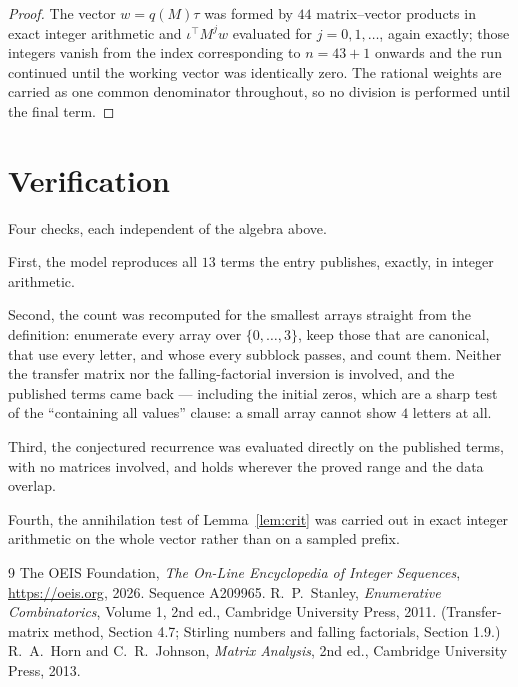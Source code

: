 \documentclass[11pt,a4paper]{article}
\theoremstyle{plain}
\theoremstyle{definition}
\begin{document}
\begin{proof}
The vector $w=q(M)\tau$ was formed by $44$ matrix--vector products in exact integer
arithmetic and $\iota^{\!\top}M^{j}w$ evaluated for $j=0,1,\dots$, again exactly; those
integers vanish from the index corresponding to $n=43+1$ onwards and the run continued
until the working vector was identically zero. The rational weights are carried as one common
denominator throughout, so no division is performed until the final term.
\end{proof}

\section{Verification}

Four checks, each independent of the algebra above.

First, the model reproduces all $13$ terms the entry publishes, exactly, in integer
arithmetic.

Second, the count was recomputed for the smallest arrays straight from the definition:
enumerate every array over $\{0,\dots,3\}$, keep those that are canonical, that use every
letter, and whose every subblock passes, and count them. Neither the transfer matrix nor the
falling-factorial inversion is involved, and the published terms came back --- including the
initial zeros, which are a sharp test of the ``containing all values'' clause: a small array
cannot show $4$ letters at all.

Third, the conjectured recurrence was evaluated directly on the published terms, with no
matrices involved, and holds wherever the proved range and the data overlap.

Fourth, the annihilation test of Lemma~\ref{lem:crit} was carried out in exact integer
arithmetic on the whole vector rather than on a sampled prefix.

\begin{thebibliography}{9}
 The OEIS Foundation, \emph{The On-Line Encyclopedia of Integer
Sequences}, \url{https://oeis.org}, 2026. Sequence A209965.
 R.~P.~Stanley, \emph{Enumerative Combinatorics}, Volume 1, 2nd ed.,
Cambridge University Press, 2011. (Transfer-matrix method, Section 4.7; Stirling numbers and
falling factorials, Section 1.9.)
 R.~A.~Horn and C.~R.~Johnson, \emph{Matrix Analysis}, 2nd ed., Cambridge
University Press, 2013.
\end{thebibliography}
\end{document}
